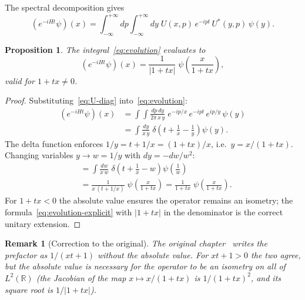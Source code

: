 \documentclass[11pt,a4paper]{article}
\newtheorem{proposition}[theorem]{Proposition}
\newtheorem{remark}{Remark}
\newcommand{\Rset}{\mathbb{R}}
\begin{document}
The spectral decomposition gives
\begin{equation}\label{eq:evolution}
  (e^{-iHt}\psi)(x)
  =\int_{-\infty}^{+\infty}dp\int_{-\infty}^{+\infty}dy\;
    U(x,p)\,e^{-ipt}\,U^{*}(y,p)\,\psi(y).
\end{equation}

\begin{proposition}
The integral~\eqref{eq:evolution} evaluates to
\begin{equation}\label{eq:evolution-explicit}
  (e^{-iHt}\psi)(x)
  =\frac{1}{\lvert 1+tx\rvert}\;
    \psi\!\left(\frac{x}{1+tx}\right),
\end{equation}
valid for $1+tx\neq 0$.
\end{proposition}

\begin{proof}
Substituting~\eqref{eq:U-diag} into~\eqref{eq:evolution}:
\begin{align*}
  (e^{-iHt}\psi)(x)
  &=\int\!\!\int\frac{dp\,dy}{2\pi\,x\,y}\;
    e^{-ip/x}\,e^{-ipt}\,e^{ip/y}\,\psi(y)\\
  &=\int\frac{dy}{x\,y}\;
    \delta\!\left(t+\frac{1}{x}-\frac{1}{y}\right)\psi(y).
\end{align*}
The delta function enforces $1/y=t+1/x=(1+tx)/x$, i.e.\ $y=x/(1+tx)$.
Changing variables $y\to w=1/y$ with $dy=-dw/w^{2}$:
\begin{align*}
  &=\int\frac{dw}{x\,w}\;
    \delta\!\left(t+\frac{1}{x}-w\right)
    \psi\!\left(\frac{1}{w}\right)\\
  &=\frac{1}{x\,(t+1/x)}\;
    \psi\!\left(\frac{x}{1+tx}\right)
  =\frac{1}{1+tx}\;
    \psi\!\left(\frac{x}{1+tx}\right).
\end{align*}
For $1+tx<0$ the absolute value ensures the operator remains an isometry;
the formula~\eqref{eq:evolution-explicit} with $\lvert 1+tx\rvert$ in the
denominator is the correct unitary extension.
\end{proof}

\begin{remark}[Correction to the original]
The original chapter~\cite{book} writes the prefactor as $1/(xt+1)$
without the absolute value.  For $xt+1>0$ the two agree, but the
absolute value is necessary for the operator to be an isometry on all of
$L^{2}(\Rset)$ (the Jacobian of the map $x\mapsto x/(1+tx)$ is
$1/(1+tx)^{2}$, and its square root is $1/\lvert 1+tx\rvert$).
\end{remark}

\end{document}
